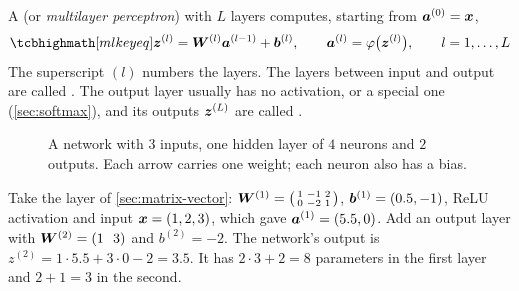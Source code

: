 \begin{definition}\label{def:mlp}
A  (or \emph{multilayer perceptron}) with $L$
layers computes, starting from $\bm{a}^{(0)} = \bm{x}$,
\[
  \keyeq{\vz^{(l)} = \mW^{(l)}\va^{(l-1)} + \vb^{(l)}, \qquad
  \va^{(l)} = \varphi\bigl(\vz^{(l)}\bigr), \qquad l = 1, \dots, L}
\]
The superscript $(l)$ numbers the layers. The layers between input and output
are called . The output layer usually has no
activation, or a special one (\cref{sec:softmax}), and its outputs
$\bm{z}^{(L)}$ are called .
\end{definition}

\begin{figure}[htbp]
\centering
{}
\caption{A network with $3$ inputs, one hidden layer of $4$ neurons and $2$
  outputs. Each arrow carries one weight; each neuron also has a bias.}
\label{fig:network}
\end{figure}

\begin{example}\label{ex:two-layer-forward}
Take the layer of \cref{sec:matrix-vector}: $\bm{W}^{(1)} = \left(\begin{smallmatrix} 1 &
-1 & 2\\ 0 & -2 & 1\end{smallmatrix}\right)$, $\bm{b}^{(1)} = (0.5, -1)$, ReLU
activation and input $\bm{x} = (1, 2, 3)$, which gave $\bm{a}^{(1)} = (5.5, 0)$. Add an
output layer with $\bm{W}^{(2)} = (1\ \ 3)$ and $b^{(2)} = -2$. The network's output
is $z^{(2)} = 1\cdot5.5 + 3\cdot0 - 2 = 3.5$. It has $2\cdot3 + 2 = 8$ parameters in
the first layer and $2 + 1 = 3$ in the second.
\end{example}

